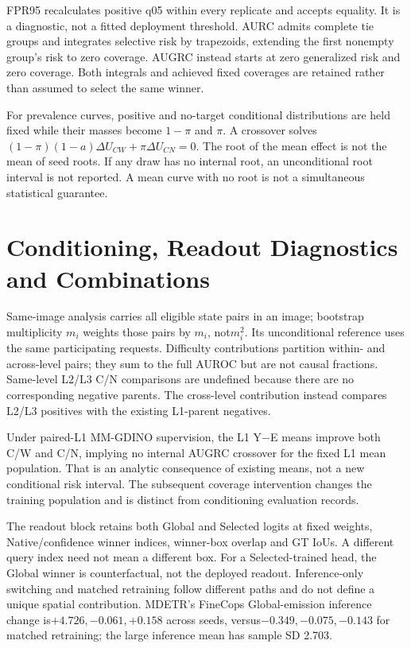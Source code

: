 \documentclass[10pt,twocolumn,letterpaper]{article}
\begin{document}
FPR95 recalculates positive q05 within every replicate and accepts equality.
It is a diagnostic, not a fitted deployment threshold. AURC admits complete
tie groups and integrates selective risk by trapezoids, extending the first
nonempty group's risk to zero coverage. AUGRC instead starts at zero
generalized risk and zero coverage. Both integrals and achieved fixed
coverages are retained rather than assumed to select the same winner.

For prevalence curves, positive and no-target conditional distributions are
held fixed while their masses become $1-\pi$ and $\pi$. A crossover solves
$(1-\pi)(1-a)\Delta U_{CW}+\pi\Delta U_{CN}=0$.
The root of the mean effect is not the mean of seed roots. If any draw has
no internal root, an unconditional root interval is not reported. A mean
curve with no root is not a simultaneous statistical guarantee.

\section{Conditioning, Readout Diagnostics and Combinations}
Same-image analysis carries all eligible state pairs in an image; bootstrap
multiplicity $m_i$ weights those pairs by $m_i$, not$m_i^2$. Its unconditional
reference uses the same participating requests. Difficulty contributions
partition within- and across-level pairs; they sum to the full AUROC but are
not causal fractions. Same-level L2/L3 C/N comparisons are undefined because
there are no corresponding negative parents. The cross-level contribution
instead compares L2/L3 positives with the existing L1-parent negatives.

Under paired-L1 MM-GDINO supervision, the L1 Y$-$E means improve both C/W
and C/N, implying no internal AUGRC crossover for the fixed L1 mean
population. That is an analytic consequence of existing means, not a new
conditional risk interval. The subsequent coverage intervention changes the
training population and is distinct from conditioning evaluation records.

The readout block retains both Global and Selected logits at fixed weights,
Native/confidence winner indices, winner-box overlap and GT IoUs. A different
query index need not mean a different box. For a Selected-trained head,
the Global winner is counterfactual, not the deployed readout. Inference-only
switching and matched retraining follow different paths and do not define a
unique spatial contribution. MDETR's FineCops Global-emission inference
change is$+4.726,-0.061,+0.158$ across seeds, versus$-0.349,-0.075,-0.143$
for matched retraining; the large inference mean has sample SD 2.703.
\end{document}

